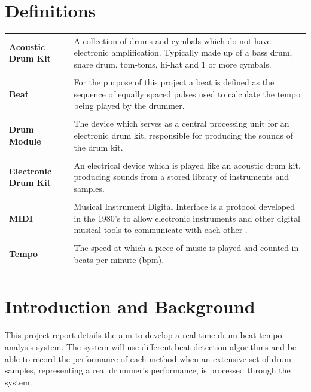 \documentclass[a4paper, 11pt]{article}
\begin{document}
\section*{Definitions}
\begin{tabular}{l p{4.5in}}\\
\textbf{Acoustic Drum Kit} & A collection of drums and cymbals which do not have electronic amplification. Typically made up of a bass drum, snare drum, tom-toms, hi-hat and 1 or more cymbals.\\\\
\textbf{Beat} & For the purpose of this project a beat is defined as the sequence of equally spaced pulses used to calculate the tempo being played by the drummer.\\\\
\textbf{Drum Module} & The device which serves as a central processing unit for an electronic drum kit, responsible for producing the sounds of the drum kit.\\\\
\textbf{Electronic Drum Kit} & An electrical device which is played like an acoustic drum kit, producing sounds from a stored library of instruments and samples.\\\\
\textbf{MIDI} & Musical Instrument Digital Interface is a protocol developed in the 1980's to allow electronic instruments and other digital musical tools to communicate with each other \cite{midi}.\\\\
\textbf{Tempo} & The speed at which a piece of music is played \cite{oxford-comp} and counted in beats per minute (bpm).\\\\
\end{tabular}
\clearpage

\maketitle{} \section{Introduction and Background}

This project report details the aim to develop a real-time drum beat tempo analysis system. The system will use different beat detection algorithms and be able to record the performance of each method when an extensive set of drum samples, representing a real drummer's performance, is processed through the system.
\end{document}
